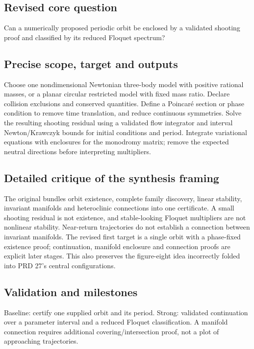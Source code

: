 \documentclass[
  11pt,
]{article}
\begin{document}
\subsection{Revised core question}

Can a numerically proposed periodic orbit be enclosed by a validated
shooting proof and classified by its reduced Floquet spectrum?

\subsection{Precise scope, target and outputs}

Choose one nondimensional Newtonian three-body model with positive
rational masses, or a planar circular restricted model with fixed mass
ratio. Declare collision exclusions and conserved quantities. Define a
Poincaré section or phase condition to remove time translation, and
reduce continuous symmetries. Solve the resulting shooting residual
using a validated flow integrator and interval Newton/Krawczyk bounds
for initial conditions and period. Integrate variational equations with
enclosures for the monodromy matrix; remove the expected neutral
directions before interpreting multipliers.

\subsection{Detailed critique of the synthesis framing}

The original bundles orbit existence, complete family discovery, linear
stability, invariant manifolds and heteroclinic connections into one
certificate. A small shooting residual is not existence, and
stable-looking Floquet multipliers are not nonlinear stability.
Near-return trajectories do not establish a connection between invariant
manifolds. The revised first target is a single orbit with a phase-fixed
existence proof; continuation, manifold enclosure and connection proofs
are explicit later stages. This also preserves the figure-eight idea
incorrectly folded into PRD 27's central configurations.

\subsection{Validation and milestones}

Baseline: certify one supplied orbit and its period. Strong: validated
continuation over a parameter interval and a reduced Floquet
classification. A manifold connection requires additional
covering/intersection proof, not a plot of approaching trajectories.
\end{document}

